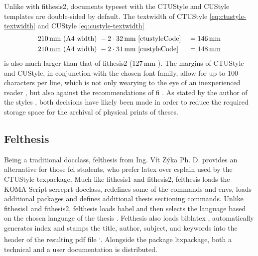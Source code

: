   Unlike with fithesis2, documents typeset with the CTUStyle and CUStyle templates are double-sided by default. The \gls{textwidth} of CTUStyle \eqref{eq:ctustyle-textwidth} and CUStyle \eqref{eq:custyle-textwidth}\begin{align}
    \label{eq:ctustyle-textwidth} 210\text{\,mm} \text{ (A4 width) } &- 2\cdot32\text{\,mm} \text{ \cite[line~249]{ctustyleCode} } &= 146\text{\,mm} \\
    \label{eq:custyle-textwidth}  210\text{\,mm} \text{ (A4 width) } &- 2\cdot31\text{\,mm} \text{ \cite[line~229]{custyleCode} } &= 148\text{\,mm}
  \end{align} is also much larger than that of fithesis2 (127\,mm \cite[lines~989, 1017, 1045]{fithesis2Code}). The margins of CTUStyle and CUStyle, in conjunction with the chosen font family, \label{overlong-lines} allow for up to 100 characters per line, which is not only wearying to the eye of an inexperienced reader \cite[section~2.1.2]{eletypostyle}, but also against the recommendations of \gls{fi} \cite[section~3.2.3]{bpdpfi}. As stated by the author of the styles \cite[post~25]{ctustyle-forums}, both decisions have likely been made in order to reduce the required storage space for the archival of physical prints of theses.

  \subsection{Felthesis}\label{sec:felthesis}
  Being a traditional \gls{docclass}, felthesis from Ing. Vít Zýka Ph. D. provides an alternative for those \gls{fel} students, who prefer \gls{latex} over \gls{csplain} used by the CTUStyle \gls{texpackage}. Much like fithesis1 and fithesis2, felthesis loads the KOMA-Script scrreprt \gls{docclass}, redefines some of the commands and \glspl{env}, loads additional packages and defines additional thesis sectioning commands. Unlike fithesis1 and fithesis2, felthesis loads babel and then selects the language based on the chosen language of the thesis \cite[lines~687--691]{felthesisCode}. Felthesis also loads biblatex\pending{} \cite[line~722]{felthesisCode}, automatically generates index\pending{} \cite[line~763]{felthesisCode} and stamps the title, author, subject, and keywords into the header of the resulting \gls{pdf} file \cite[lines~959--971]{felthesisCode}\label{pdf-stamping}\textsuperscript{,}. Alongside the package \gls{ltxpackage}, both a technical \cite{felthesisCode} and a user documentation \cite{felthesis} is distributed\pending{}.

